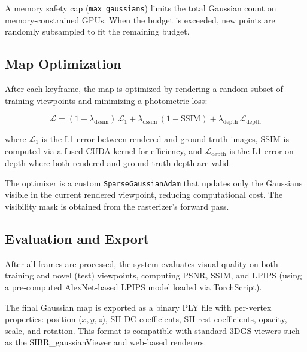 A memory safety cap (\texttt{max\_gaussians}) limits the total Gaussian
count on memory-constrained GPUs. When the budget is exceeded, new points
are randomly subsampled to fit the remaining budget.

\subsection{Map Optimization}

After each keyframe, the map is optimized by rendering a random subset of
training viewpoints and minimizing a photometric loss:

\begin{equation}
    \mathcal{L} = (1 - \lambda_{\text{dssim}}) \, \mathcal{L}_1
                + \lambda_{\text{dssim}} \, (1 - \text{SSIM})
                + \lambda_{\text{depth}} \, \mathcal{L}_{\text{depth}}
\end{equation}

where $\mathcal{L}_1$ is the L1 error between rendered and ground-truth
images, SSIM is computed via a fused CUDA kernel for efficiency, and
$\mathcal{L}_{\text{depth}}$ is the L1 error on depth where both rendered
and ground-truth depth are valid.

The optimizer is a custom \texttt{SparseGaussianAdam} that updates only
the Gaussians visible in the current rendered viewpoint, reducing
computational cost. The visibility mask is obtained from the rasterizer's
forward pass.

\subsection{Evaluation and Export}

After all frames are processed, the system evaluates visual quality on
both training and novel (test) viewpoints, computing PSNR, SSIM, and
LPIPS (using a pre-computed AlexNet-based LPIPS model loaded via TorchScript).

The final Gaussian map is exported as a binary PLY file with per-vertex
properties: position ($x, y, z$), SH DC coefficients, SH rest coefficients,
opacity, scale, and rotation. This format is compatible with standard
3DGS viewers such as the SIBR\_gaussianViewer and web-based renderers.
